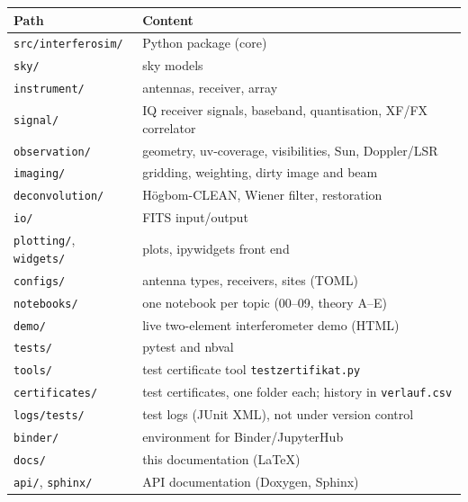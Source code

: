 
\begin{tabularx}{\linewidth}{@{}lL@{}}
\toprule
\textbf{Path} & \textbf{Content} \\
\midrule
\texttt{src/interferosim/} & Python package (core) \\
\texttt{\quad sky/} & sky models \\
\texttt{\quad instrument/} & antennas, receiver, array \\
\texttt{\quad signal/} & IQ receiver signals, baseband, quantisation, XF/FX correlator \\
\texttt{\quad observation/} & geometry, uv-coverage, visibilities, Sun, Doppler/LSR \\
\texttt{\quad imaging/} & gridding, weighting, dirty image and beam \\
\texttt{\quad deconvolution/} & H\"ogbom-CLEAN, Wiener filter, restoration \\
\texttt{\quad io/} & FITS input/output \\
\texttt{\quad plotting/}, \texttt{widgets/} & plots, ipywidgets front end \\
\texttt{configs/} & antenna types, receivers, sites (TOML) \\
\texttt{notebooks/} & one notebook per topic (00--09, theory A--E) \\
\texttt{demo/} & live two-element interferometer demo (HTML) \\
\texttt{tests/} & pytest and nbval \\
\texttt{tools/} & test certificate tool \texttt{testzertifikat.py} \\
\texttt{certificates/} & test certificates, one folder each; history in
  \texttt{verlauf.csv} \\
\texttt{logs/tests/} & test logs (JUnit XML), not under version control \\
\texttt{binder/} & environment for Binder/JupyterHub \\
\texttt{docs/} & this documentation (\LaTeX) \\
\texttt{\quad api/}, \texttt{sphinx/} & API documentation (Doxygen, Sphinx) \\
\bottomrule
\end{tabularx}
